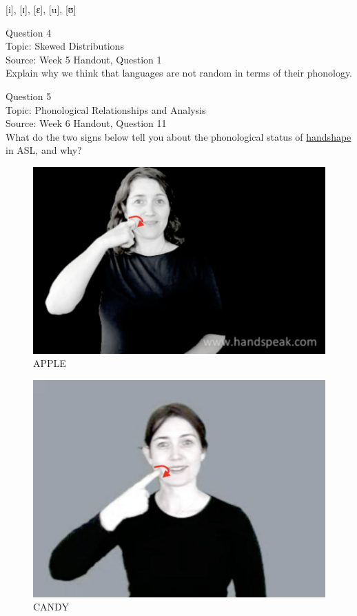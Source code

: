 \documentclass[12pt]{article}
\begin{document}
{[i]}, {[ɪ]}, {[ɛ]}, {[u]}, {[ʊ]}


\newpage

{\large Question 4}\\

Topic: Skewed Distributions\\
Source: Week 5 Handout, Question 1\\

Explain why we think that languages are not random in terms of their phonology.\\


\newpage

{\large Question 5}\\

Topic: Phonological Relationships and Analysis\\
Source: Week 6 Handout, Question 11\\

What do the two signs below tell you about the phonological status of \underline{handshape} in ASL, and why?\\

\begin{figure}[H]
\includegraphics{../images/asl_apple.png}
\caption{APPLE}
\end{figure}
\begin{figure}[H]
\includegraphics{../images/asl_candy.png}
\caption{CANDY}
\end{figure}
\end{document}
